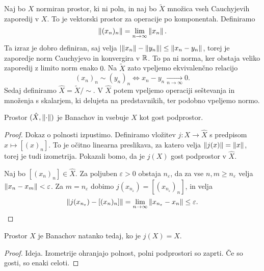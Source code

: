 
Naj bo $X$ normiran prostor, ki ni poln, in naj bo $\tilde{X}$ množica vseh
Cauchyjevih zaporedij v $X$.
To je vektorski prostor za operacije po komponentah.
Definiramo
\[
  \left\lVert(x_n)_n\right\rVert = \lim_{n \to \infty} \left\lVert x_n\right\rVert.
\]
Ta izraz je dobro definiran, saj velja $\left| \left\lVert x_n\right\rVert - \left\lVert y_n\right\rVert \right| \le
\left\lVert x_n - y_n\right\rVert$, torej je zaporedje norm Cauchyjevo in konvergira v $\mathbb{R}$.
To pa ni norma, ker obstaja veliko zaporedij z limito norm enako $0$.
Na $\tilde{X}$ zato vpeljemo ekvivalenčno relacijo
\[
  (x_n)_n \sim (y_n)_n \iff x_n - y_n \xrightarrow[n \to \infty]{} 0.
\]
Sedaj definiramo $\hat{X} = \tilde{X} / \sim$.
V $\hat{X}$ potem vpeljemo operaciji seštevanja in množenja s skalarjem, ki
delujeta na predstavnikih, ter podobno vpeljemo normo.

\begin{izrek}
  Prostor $(\hat{X}, \left\lVert\cdot\right\rVert)$ je Banachov in vsebuje $X$ kot gost
  podprostor.
\end{izrek}

\begin{proof}
  Dokaz o polnosti izpustimo.
  Definiramo vložitev $j: X \to \hat{X}$ s predpisom $x \mapsto [(x)_n]$.
  To je očitno linearna preslikava, za katero velja $\left\lVert j(x)\right\rVert = \left\lVert x\right\rVert$,
  torej je tudi izometrija.
  Pokazali bomo, da je $j(X)$ gost podprostor v $\hat{X}$.

  Naj bo $[(x_n)_n] \in \hat{X}$.
  Za poljuben $\varepsilon > 0$ obstaja $n_\varepsilon$, da za vse $n, m \ge
  n_\varepsilon$ velja $\left\lVert x_n - x_m\right\rVert < \varepsilon$.
  Za $m = n_\varepsilon$ dobimo $j(x_{n_\varepsilon}) =
  [(x_{n_\varepsilon})_n]$, in velja
  \[
	\left\lVert j(x_{n_\varepsilon}) - [(x_n)_n]\right\rVert = \lim_{n \to \infty}
	\left\lVert x_{n_\varepsilon} - x_n\right\rVert \le \varepsilon.
	\qedhere
  \]
\end{proof}


\begin{posledica}
  Prostor $X$ je Banachov natanko tedaj, ko je $j(X) = \hat{X}$.
\end{posledica}

\begin{proof}
  Ideja.
  Izometrije ohranjajo polnost, polni podprostori so zaprti.
  Če so gosti, so enaki celoti.
\end{proof}

